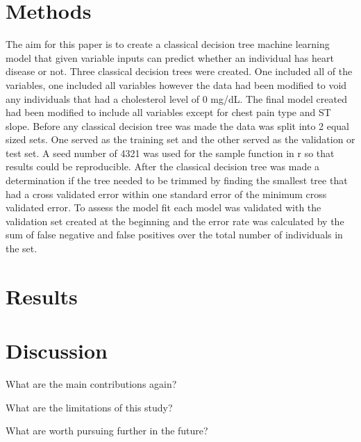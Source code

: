 \documentclass[12pt]{article}
\begin{document}
\section{Methods}
\label{sec:meth}


The aim for this paper is to create a classical decision tree machine learning model that given variable inputs can predict whether an individual has heart disease or not.
Three classical decision trees were created. One included all of the variables, one included all variables however the data had been modified to void any individuals that had a cholesterol level of 0 mg/dL. The final model created had been modified to include all variables except for chest pain type and ST slope.
Before any classical decision tree was made the data was split into 2 equal sized sets. One served as the training set and the other served as the validation or test set. A seed number of 4321 was used for the sample function in r so that results could be reproducible.
After the classical decision tree was made a determination if the tree needed to be trimmed by finding the smallest tree that had a cross validated error within one standard error of the minimum cross validated error.
To assess the model fit each model was validated with the validation set created at the beginning and the error rate was calculated by the sum of false negative and false positives over the total number of individuals in the set.


\section{Results}
\label{sec:resu}

\section{Discussion}
\label{sec:disc}

What are the main contributions again?

What are the limitations of this study?

What are worth pursuing further in the future?



\end{document}
